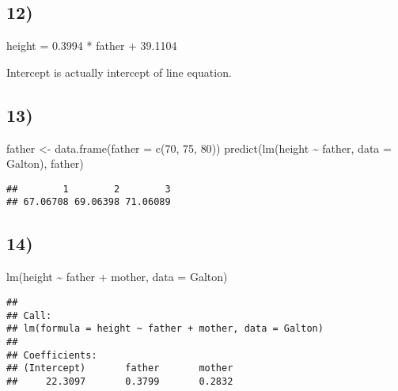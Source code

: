 \documentclass[
]{article}
\newenvironment{Shaded}{\begin{snugshade}}{\end{snugshade}}
\newcommand{\AttributeTok}[1]{\textcolor[rgb]{0.77,0.63,0.00}{#1}}
\newcommand{\DecValTok}[1]{\textcolor[rgb]{0.00,0.00,0.81}{#1}}
\newcommand{\FunctionTok}[1]{\textcolor[rgb]{0.00,0.00,0.00}{#1}}
\newcommand{\NormalTok}[1]{#1}
\newcommand{\OtherTok}[1]{\textcolor[rgb]{0.56,0.35,0.01}{#1}}
\newcommand{\SpecialCharTok}[1]{\textcolor[rgb]{0.00,0.00,0.00}{#1}}
\begin{document}
\hypertarget{section-11}{%
\subsection{12)}\label{section-11}}

height = 0.3994 * father + 39.1104

Intercept is actually intercept of line equation.

\hypertarget{section-12}{%
\subsection{13)}\label{section-12}}

\begin{Shaded}
\begin{Highlighting}[]
\NormalTok{father }\OtherTok{\textless{}{-}} \FunctionTok{data.frame}\NormalTok{(}\AttributeTok{father =} \FunctionTok{c}\NormalTok{(}\DecValTok{70}\NormalTok{, }\DecValTok{75}\NormalTok{, }\DecValTok{80}\NormalTok{))}
\FunctionTok{predict}\NormalTok{(}\FunctionTok{lm}\NormalTok{(height }\SpecialCharTok{\textasciitilde{}}\NormalTok{ father, }\AttributeTok{data =}\NormalTok{ Galton), father)}
\end{Highlighting}
\end{Shaded}

\begin{verbatim}
##        1        2        3 
## 67.06708 69.06398 71.06089
\end{verbatim}

\hypertarget{section-13}{%
\subsection{14)}\label{section-13}}

\begin{Shaded}
\begin{Highlighting}[]
\FunctionTok{lm}\NormalTok{(height }\SpecialCharTok{\textasciitilde{}}\NormalTok{ father }\SpecialCharTok{+}\NormalTok{ mother, }\AttributeTok{data =}\NormalTok{ Galton)}
\end{Highlighting}
\end{Shaded}

\begin{verbatim}
## 
## Call:
## lm(formula = height ~ father + mother, data = Galton)
## 
## Coefficients:
## (Intercept)       father       mother  
##     22.3097       0.3799       0.2832
\end{verbatim}
\end{document}

